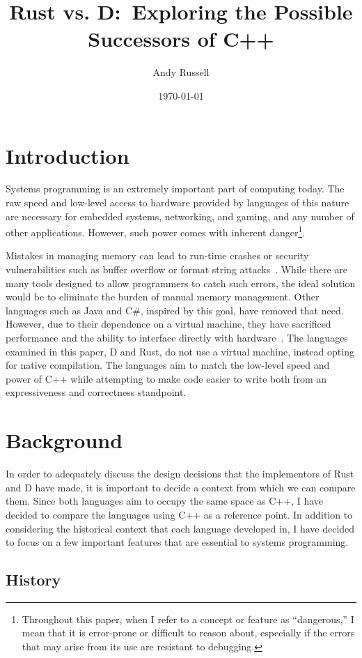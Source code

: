 \documentclass[draftcopy,nolof,nolot]{srpaper}
\title{Rust vs. D:\ Exploring the Possible Successors of C++}
\author{Andy Russell}
\date{\today}
\begin{document}
\frontmatter

\listoflistings{}

\chapter{Introduction}

Systems programming is an extremely important part of computing today. The raw
speed and low-level access to hardware provided by languages of this nature are
necessary for embedded systems, networking, and gaming, and any number of other
applications. However, such power comes with inherent
danger\footnote{Throughout this paper, when I refer to a concept or feature as
``dangerous,'' I mean that it is error-prone or difficult to reason about,
especially if the errors that may arise from its use are resistant to
debugging.}.

Mistakes in managing memory can lead to run-time crashes or security
vulnerabilities such as buffer overflow or format string
attacks~\cite{Shahriar:2012:MPS:2187671.2187673}. While there are many tools
designed to allow programmers to catch such errors, the ideal solution would be
to eliminate the burden of manual memory management. Other languages such as
Java and C\#, inspired by this goal, have removed that need. However, due to
their dependence on a virtual machine, they have sacrificed performance and the
ability to interface directly with
hardware~\cite{Alexandrescu:2010:DPL:1875434}. The languages examined in this
paper, D and Rust, do not use a virtual machine, instead opting for native
compilation. The languages aim to match the low-level speed and power of C++
while attempting to make code easier to write both from an expressiveness and
correctness standpoint.

\chapter{Background}

In order to adequately discuss the design decisions that the implementors of
Rust and D have made, it is important to decide a context from which we can
compare them. Since both languages aim to occupy the same space as C++, I have
decided to compare the languages using C++ as a reference point. In addition
to considering the historical context that each language developed in, I have
decided to focus on a few important features that are essential to systems
programming.

\section{History}
\end{document}
